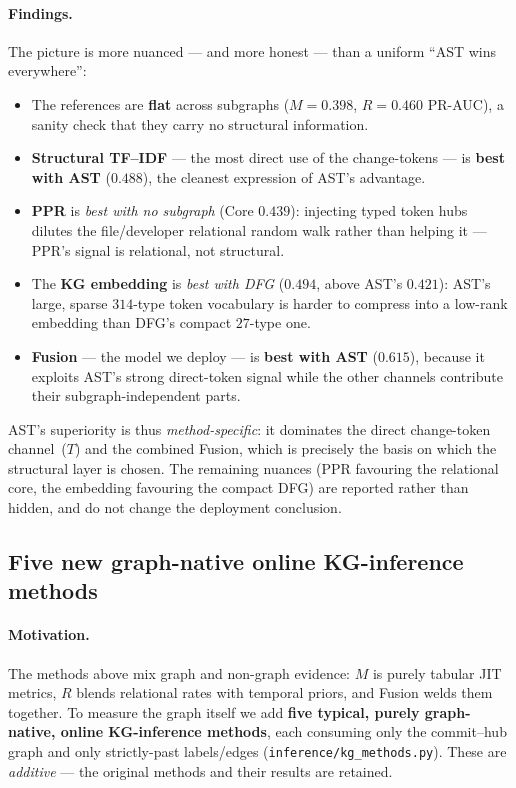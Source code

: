 \documentclass[11pt,a4paper]{article}
\newcommand{\code}[1]{\texttt{#1}}
\begin{document}
	\paragraph{Findings.} The picture is more nuanced --- and more honest --- than a
	uniform ``AST wins everywhere'':
	\begin{itemize}[nosep,leftmargin=1.4em]
		\item The references are \textbf{flat} across subgraphs ($M=0.398$,
		$R=0.460$ PR-AUC), a sanity check that they carry no structural information.
		\item \textbf{Structural TF--IDF} --- the most direct use of the
		change-tokens --- is \textbf{best with AST} ($0.488$), the cleanest
		expression of AST's advantage.
		\item \textbf{PPR} is \emph{best with no subgraph} (Core $0.439$): injecting
		typed token hubs dilutes the file/developer relational random walk rather
		than helping it --- PPR's signal is relational, not structural.
		\item The \textbf{KG embedding} is \emph{best with DFG} ($0.494$, above AST's
		$0.421$): AST's large, sparse $314$-type token vocabulary is harder to
		compress into a low-rank embedding than DFG's compact $27$-type one.
		\item \textbf{Fusion} --- the model we deploy --- is \textbf{best with AST}
		($0.615$), because it exploits AST's strong direct-token signal while the
		other channels contribute their subgraph-independent parts.
	\end{itemize}
	AST's superiority is thus \emph{method-specific}: it dominates the direct
	change-token channel~($T$) and the combined Fusion, which is precisely the
	basis on which the structural layer is chosen. The remaining nuances (PPR
	favouring the relational core, the embedding favouring the compact DFG) are
	reported rather than hidden, and do not change the deployment conclusion.

	\subsection{Five new graph-native online KG-inference methods}\label{sec:v4-graphnative}
	\paragraph{Motivation.} The methods above mix graph and non-graph evidence: $M$
	is purely tabular JIT metrics, $R$ blends relational rates with temporal priors,
	and Fusion welds them together. To measure the graph itself we add \textbf{five
	typical, purely graph-native, online KG-inference methods}, each consuming only
	the commit--hub graph and only strictly-past labels/edges
	(\code{inference/kg\_methods.py}). These are \emph{additive} --- the original
	methods and their results are retained.
\end{document}
